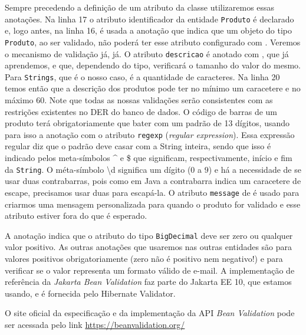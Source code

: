 Sempre precedendo a definição de um atributo da classe utilizaremos essas anotações. Na linha 17 o atributo identificador da entidade \texttt{Produto} é declarado e, logo antes, na linha 16, é usada a anotação  que indica que um objeto do tipo \texttt{Produto}, ao ser validado, não poderá ter esse atributo configurado com . Veremos o mecanismo de validação já, já. O atributo \texttt{descricao} é anotado com , que já aprendemos, e  que, dependendo do tipo, verificará o tamanho do valor do mesmo. Para \texttt{Strings}, que é o nosso caso, é a quantidade de caracteres. Na linha 20 temos então que a descrição dos produtos pode ter no mínimo um caracetere e no máximo 60. Note que todas as nossas validações serão consistentes com as restrições existentes no DER do banco de dados. O código de barras de um produto terá obrigatoriamente que bater com um padrão de 13 dígitos, usando para isso a anotação  com o atributo \texttt{regexp} (\textit{regular expression}). Essa expressão regular diz que o padrão deve casar com a String inteira, sendo que isso é indicado pelos meta-símbolos \^{} e \$ que significam, respectivamente, início e fim da \texttt{String}. O méta-símbolo \textbackslash{}d significa um dígito ($0$ a $9$) e há a necessidade de se usar duas contrabarras, pois como em Java a contrabarra indica um caracetere de escape, precisamos usar duas para escapá-la. O atributo \texttt{message} de  é usado para criarmos uma mensagem personalizada para quando o produto for validado e esse atributo estiver fora do que é esperado.

A anotação  indica que o atributo do tipo \texttt{BigDecimal} deve ser zero ou qualquer valor positivo. As outras anotações que usaremos nas outras entidades são  para valores positivos obrigatoriamente (zero não é positivo nem negativo!) e  para verificar se o valor representa um formato válido de e-mail. A implementação de referência da \textit{Jakarta Bean Validation} faz parte do Jakarta EE 10, que estamos usando, e é fornecida pelo Hibernate Validator.

\begin{saibaMais}
    O site oficial da especificação e da implementação da API \textit{Bean Validation} pode ser acessada pelo link \url{https://beanvalidation.org/}
\end{saibaMais}

